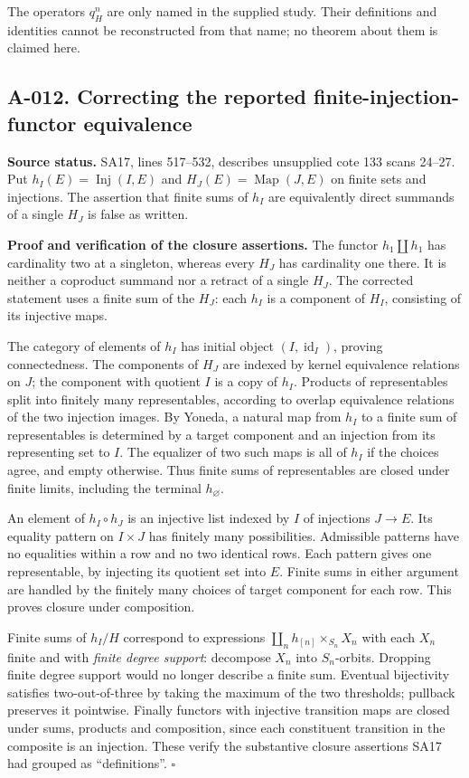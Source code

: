 The operators $q_H^n$ are only named in the supplied study. Their
definitions and identities cannot be reconstructed from that name;
no theorem about them is claimed here.

\subsection*{A-012. Correcting the reported finite-injection-functor equivalence}
\textbf{Source status.} SA17, lines 517--532, describes unsupplied
cote 133 scans 24--27. Put
$h_I(E)=\operatorname{Inj}(I,E)$ and $H_J(E)=\operatorname{Map}(J,E)$
on finite sets and injections. The assertion that finite sums of
$h_I$ are equivalently direct summands of a single $H_J$ is false
as written.

\textbf{Proof and verification of the closure assertions.}
The functor $h_1\amalg h_1$ has cardinality two at a singleton,
whereas every $H_J$ has cardinality one there. It is neither a
coproduct summand nor a retract of a single $H_J$. The corrected
statement uses a finite sum of the $H_J$: each $h_I$ is a component
of $H_I$, consisting of its injective maps.

The category of elements of $h_I$ has initial object
$(I,\operatorname{id}_I)$, proving connectedness. The components
of $H_J$ are indexed by kernel equivalence relations on $J$; the
component with quotient $I$ is a copy of $h_I$. Products of
representables split into finitely many representables, according
to overlap equivalence relations of the two injection images.
By Yoneda, a natural map from $h_I$ to a finite sum of representables
is determined by a target component and an injection from its
representing set to $I$. The equalizer of two such maps is all
of $h_I$ if the choices agree, and empty otherwise. Thus finite
sums of representables are closed under finite limits, including
the terminal $h_\varnothing$.

An element of $h_I\circ h_J$ is an injective list indexed by $I$
of injections $J\to E$. Its equality pattern on $I\times J$ has
finitely many possibilities. Admissible patterns have no equalities
within a row and no two identical rows. Each pattern gives one
representable, by injecting its quotient set into $E$. Finite sums
in either argument are handled by the finitely many choices of
target component for each row. This proves closure under composition.

Finite sums of $h_I/H$ correspond to expressions
$\coprod_n h_{[n]}\times_{S_n}X_n$ with each $X_n$ finite and with
\emph{finite degree support}: decompose $X_n$ into $S_n$-orbits.
Dropping finite degree support would no longer describe a finite
sum. Eventual bijectivity satisfies two-out-of-three by taking the
maximum of the two thresholds; pullback preserves it pointwise.
Finally functors with injective transition maps are closed under
sums, products and composition, since each constituent transition
in the composite is an injection. These verify the substantive
closure assertions SA17 had grouped as ``definitions''.
\hfill$\square$

